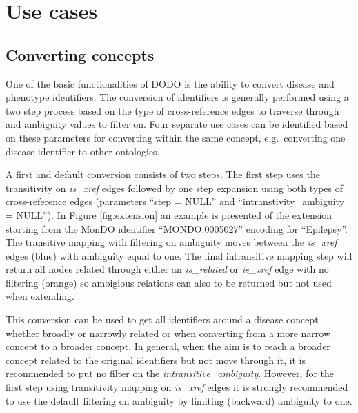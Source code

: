 \documentclass[9pt,a4paper,]{extarticle}
\begin{document}
\hypertarget{use-cases}{%
\section{Use cases}\label{use-cases}}

\hypertarget{converting-concepts}{%
\subsection{Converting concepts}\label{converting-concepts}}

One of the basic functionalities of DODO is the ability to convert disease and phenotype identifiers. The conversion of identifiers is generally performed using a two step process based on the type of cross-reference edges to traverse through and ambiguity values to filter on. Four separate use cases can be identified based on these parameters for converting within the same concept, e.g.~converting one disease identifier to other ontologies.

A first and default conversion consists of two steps. The first step uses the transitivity on \emph{is\_xref} edges followed by one step expansion using both types of cross-reference edges (parameters ``step = NULL'' and ``intranstivity\_ambiguity = NULL''). In Figure \ref{fig:extension} an example is presented of the extension starting from the MonDO identifier ``MONDO:0005027'' encoding for ``Epilepsy''. The transitive mapping with filtering on ambiguity moves between the \emph{is\_xref} edges (blue) with ambiguity equal to one. The final intransitive mapping step will return all nodes related through either an \emph{is\_related} or \emph{is\_xref} edge with no filtering (orange) so ambigious relations can also to be returned but not used when extending.

This conversion can be used to get all identifiers around a disease concept whether broadly or narrowly related or when converting from a more narrow concept to a broader concept. In general, when the aim is to reach a broader concept related to the original identifiers but not move through it, it is recommended to put no filter on the \emph{intransitive\_ambiguity}. However, for the first step using transitivity mapping on \emph{is\_xref} edges it is strongly recommended to use the default filtering on ambiguity by limiting (backward) ambiguity to one.
\end{document}
